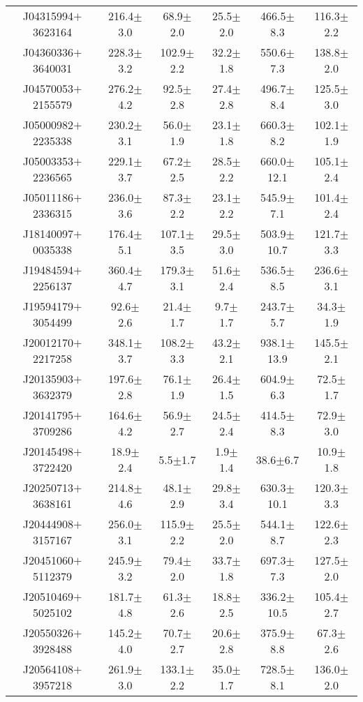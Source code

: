 \documentclass[printer]{aa} %
\begin{document}
\begin{table*}
\begin{tabular}{c c c c c c}
 J04315994$+$3623164  & 216.4$\pm$3.0 & 68.9$\pm$2.0 & 25.5$\pm$2.0 & 466.5$\pm$8.3 & 116.3$\pm$2.2\\ 
 J04360336$+$3640031  & 228.3$\pm$3.2 & 102.9$\pm$2.2 & 32.2$\pm$1.8 & 550.6$\pm$7.3 & 138.8$\pm$2.0\\ 
 J04570053$+$2155579  & 276.2$\pm$4.2 & 92.5$\pm$2.8 & 27.4$\pm$2.8 & 496.7$\pm$8.4 & 125.5$\pm$3.0\\ 
 J05000982$+$2235338  & 230.2$\pm$3.1 & 56.0$\pm$1.9 & 23.1$\pm$1.8 & 660.3$\pm$8.2 & 102.1$\pm$1.9\\ 
 J05003353$+$2236565  & 229.1$\pm$3.7 & 67.2$\pm$2.5 & 28.5$\pm$2.2 & 660.0$\pm$12.1 & 105.1$\pm$2.4\\ 
 J05011186$+$2336315  & 236.0$\pm$3.6 & 87.3$\pm$2.2 & 23.1$\pm$2.2 & 545.9$\pm$7.1 & 101.4$\pm$2.4\\ 
 J18140097$+$0035338  & 176.4$\pm$5.1 & 107.1$\pm$3.5 & 29.5$\pm$3.0 & 503.9$\pm$10.7 & 121.7$\pm$3.3\\ 
 J19484594$+$2256137  & 360.4$\pm$4.7 & 179.3$\pm$3.1 & 51.6$\pm$2.4 & 536.5$\pm$8.5 & 236.6$\pm$3.1\\ 
 J19594179$+$3054499  & 92.6$\pm$2.6 & 21.4$\pm$1.7 & 9.7$\pm$1.7 & 243.7$\pm$5.7 & 34.3$\pm$1.9\\ 
 J20012170$+$2217258  & 348.1$\pm$3.7 & 108.2$\pm$3.3 & 43.2$\pm$2.1 & 938.1$\pm$13.9 & 145.5$\pm$2.1\\
 J20135903$+$3632379  & 197.6$\pm$2.8 & 76.1$\pm$1.9 & 26.4$\pm$1.5 & 604.9$\pm$6.3 & 72.5$\pm$1.7\\ 
 J20141795$+$3709286  & 164.6$\pm$4.2 & 56.9$\pm$2.7 & 24.5$\pm$2.4 & 414.5$\pm$8.3 & 72.9$\pm$3.0\\ 
 J20145498$+$3722420  & 18.9$\pm$2.4 & 5.5$\pm$1.7 & 1.9$\pm$1.4 & 38.6$\pm$6.7 & 10.9$\pm$1.8\\ 
 J20250713$+$3638161  & 214.8$\pm$4.6 & 48.1$\pm$2.9 & 29.8$\pm$3.4 & 630.3$\pm$10.1 & 120.3$\pm$3.3\\  
 J20444908$+$3157167  & 256.0$\pm$3.1 & 115.9$\pm$2.2 & 25.5$\pm$2.0 & 544.1$\pm$8.7 & 122.6$\pm$2.3\\ 
 J20451060$+$5112379  & 245.9$\pm$3.2 & 79.4$\pm$2.0 & 33.7$\pm$1.8 & 697.3$\pm$7.3 & 127.5$\pm$2.0\\ 
 J20510469$+$5025102  & 181.7$\pm$4.8 & 61.3$\pm$2.6 & 18.8$\pm$2.5 & 336.2$\pm$10.5 & 105.4$\pm$2.7\\ 
 J20550326$+$3928488  & 145.2$\pm$4.0 & 70.7$\pm$2.7 & 20.6$\pm$2.8 & 375.9$\pm$8.8 & 67.3$\pm$2.6\\ 
 J20564108$+$3957218  & 261.9$\pm$3.0 & 133.1$\pm$2.2 & 35.0$\pm$1.7 & 728.5$\pm$8.1 & 136.0$\pm$2.0\\ 

\end{tabular}
\end{table*}
\end{document}
